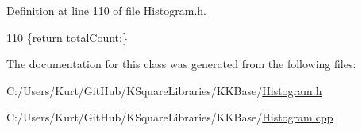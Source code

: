 Definition at line 110 of file Histogram.\+h.


\begin{DoxyCode}
110 \{\textcolor{keywordflow}{return}  totalCount;\}
\end{DoxyCode}


The documentation for this class was generated from the following files\+:\begin{DoxyCompactItemize}
\item 
C\+:/\+Users/\+Kurt/\+Git\+Hub/\+K\+Square\+Libraries/\+K\+K\+Base/\hyperlink{_histogram_8h}{Histogram.\+h}\item 
C\+:/\+Users/\+Kurt/\+Git\+Hub/\+K\+Square\+Libraries/\+K\+K\+Base/\hyperlink{_histogram_8cpp}{Histogram.\+cpp}\end{DoxyCompactItemize}
